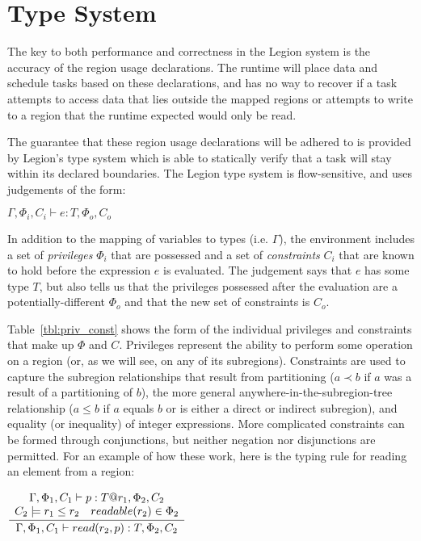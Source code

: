\section{Type System}

The key to both performance and correctness in the Legion system is the
accuracy of the region usage declarations.  The runtime will place data and
schedule tasks based on these declarations, and has no way to recover if a 
task attempts to access data that lies outside the mapped regions or attempts
to write to a region that the runtime expected would only be read.

The guarantee that these region usage declarations will be adhered to is
provided by Legion's type system which is able to statically verify that a 
task will stay within its declared boundaries.  The Legion type system is
flow-sensitive, and uses judgements of the form:

\begin{center}
$\Gamma, \Phi_i, C_i \vdash e : T, \Phi_o, C_o$
\end{center}

In addition to the mapping of variables to types (i.e. $\Gamma$), the
environment includes a set of \emph{privileges} $\Phi_i$ that are possessed
and a set of \emph{constraints} $C_i$ that are known to hold before the 
expression $e$ is evaluated.  The judgement says that $e$ has some type $T$,
but also tells us that the privileges possessed after the
evaluation are a potentially-different $\Phi_o$ and that the new set of 
constraints is $C_o$.

Table~\ref{tbl:priv_const} shows the form of the individual privileges and
constraints that make up $\Phi$ and $C$.  Privileges represent the ability to
perform some operation on a region (or, as we will see, on any of its
subregions).  Constraints are used to capture the subregion relationships that
result from partitioning ($a \prec b$ if $a$ was a result of a partitioning of
$b$), the more general anywhere-in-the-subregion-tree relationship ($a \le b$ if $a$ equals $b$ or is either a direct or indirect subregion), and equality (or
inequality) of integer expressions.  More complicated constraints can be formed
through conjunctions, but neither negation nor disjunctions are permitted.  For
an example of how these work, here is the typing rule for reading an element
from a region:

\begin{center}
{\small
\begin{math}
\infrule{
\begin{array}{lc}
  \multicolumn{2}{c}{\Gamma, \Phi_1, C_1 \vdash p : T@r_1, \Phi_2, C_2} \\
  C_2 \models r_1 \le r_2 & readable(r_2) \in \Phi_2
\end{array}
}
{
  \Gamma, \Phi_1, C_1 \vdash read(r_2, p) : T, \Phi_2, C_2
}
\end{math} 
}
\end{center}


